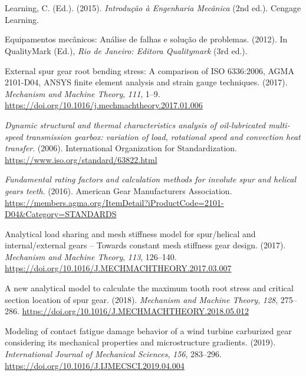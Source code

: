 \documentclass[12pt,a4paper]{article}
\begin{document}
\FloatBarrier
\section*{\refname}\sloppy
{}
\label{csl:1}Learning, C. (Ed.). (2015). \textit{{Introdução à Engenharia Mecânica}} (2nd ed.). Cengage Learning.

\label{csl:2}{Equipamentos mecânicos: Análise de falhas e solução de problemas}. (2012). In QualityMark (Ed.), \textit{Rio de Janeiro: Editora Qualitymark} (3rd ed.).

\label{csl:3}{External spur gear root bending stress: A comparison of ISO 6336:2006, AGMA 2101-D04, ANSYS finite element analysis and strain gauge techniques}. (2017). \textit{Mechanism and Machine Theory}, \textit{111}, 1–9. \url{https://doi.org/10.1016/j.mechmachtheory.2017.01.006}

\label{csl:4}\textit{{Dynamic structural and thermal characteristics analysis of oil-lubricated multi-speed transmission gearbox: variation of load, rotational speed and convection heat transfer}}. (2006). International Organization for Standardization. \url{https://www.iso.org/standard/63822.html}

\label{csl:5}\textit{{Fundamental rating factors and calculation methods for involute spur and helical gears teeth}}. (2016). American Gear Manufacturers Association. \url{https://members.agma.org/ItemDetail?iProductCode=2101-D04\&Category=STANDARDS}

\label{csl:6}{Analytical load sharing and mesh stiffness model for spur/helical and internal/external gears – Towards constant mesh stiffness gear design}. (2017). \textit{Mechanism and Machine Theory}, \textit{113}, 126–140. \url{https://doi.org/10.1016/J.MECHMACHTHEORY.2017.03.007}

\label{csl:7}{A new analytical model to calculate the maximum tooth root stress and critical section location of spur gear}. (2018). \textit{Mechanism and Machine Theory}, \textit{128}, 275–286. \url{https://doi.org/10.1016/J.MECHMACHTHEORY.2018.05.012}

\label{csl:8}{Modeling of contact fatigue damage behavior of a wind turbine carburized gear considering its mechanical properties and microstructure gradients}. (2019). \textit{International Journal of Mechanical Sciences}, \textit{156}, 283–296. \url{https://doi.org/10.1016/J.IJMECSCI.2019.04.004}
\end{document}
